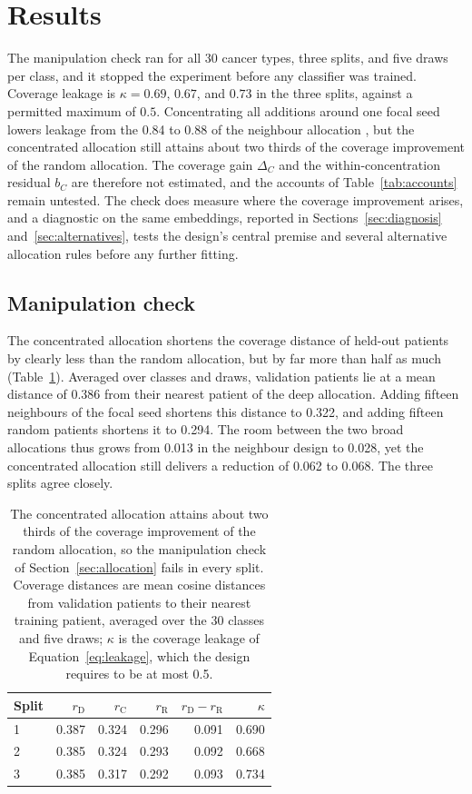 \section{Results}
\label{sec:results}
The manipulation check ran for all 30 cancer types, three splits, and five draws per class, and it stopped the experiment before any classifier was trained. Coverage leakage is $\kappa=0.69$, $0.67$, and $0.73$ in the three splits, against a permitted maximum of $0.5$. Concentrating all additions around one focal seed lowers leakage from the 0.84 to 0.88 of the neighbour allocation \citep{queisler2026patientCoverage}, but the concentrated allocation still attains about two thirds of the coverage improvement of the random allocation. The coverage gain $\Delta_C$ and the within-concentration residual $b_C$ are therefore not estimated, and the accounts of Table~\ref{tab:accounts} remain untested. The check does measure where the coverage improvement arises, and a diagnostic on the same embeddings, reported in Sections~\ref{sec:diagnosis} and~\ref{sec:alternatives}, tests the design's central premise and several alternative allocation rules before any further fitting.

\subsection{Manipulation check}
\label{sec:check-results}
The concentrated allocation shortens the coverage distance of held-out patients by clearly less than the random allocation, but by far more than half as much (Table~\ref{tab:check}). Averaged over classes and draws, validation patients lie at a mean distance of 0.386 from their nearest patient of the deep allocation. Adding fifteen neighbours of the focal seed shortens this distance to 0.322, and adding fifteen random patients shortens it to 0.294. The room between the two broad allocations thus grows from 0.013 in the neighbour design to 0.028, yet the concentrated allocation still delivers a reduction of 0.062 to 0.068. The three splits agree closely.

\begin{table}[htbp]
\centering
\renewcommand{\arraystretch}{1.15}
\begin{tabular}{@{}lrrrrr@{}}
\toprule
Split & $r_{\mathrm D}$ & $r_{\mathrm C}$ & $r_{\mathrm R}$ & $r_{\mathrm D}-r_{\mathrm R}$ & $\kappa$ \\
\midrule
1 & 0.387 & 0.324 & 0.296 & 0.091 & 0.690 \\
2 & 0.385 & 0.324 & 0.293 & 0.092 & 0.668 \\
3 & 0.385 & 0.317 & 0.292 & 0.093 & 0.734 \\
\bottomrule
\end{tabular}
\caption{The concentrated allocation attains about two thirds of the coverage improvement of the random allocation, so the manipulation check of Section~\ref{sec:allocation} fails in every split. Coverage distances are mean cosine distances from validation patients to their nearest training patient, averaged over the 30 classes and five draws; $\kappa$ is the coverage leakage of Equation~\eqref{eq:leakage}, which the design requires to be at most 0.5.}
\label{tab:check}
\end{table}

